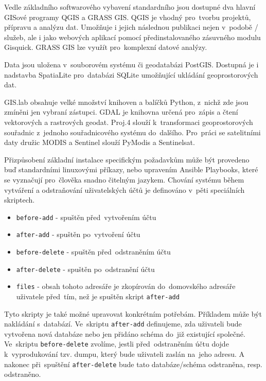Vedle základního softwarového vybavení standardního  jsou
dostupné dva hlavní GISové programy QGIS a GRASS GIS. \cite{gislab-main} QGIS je vhodný
pro~tvorbu projektů, přípravu a analýzu dat. Umožňuje i jejich
následnou publikaci nejen v~podobě / služeb, ale i
jako webových aplikací pomocí předinstalovaného zásuv\-ného modulu
Gisquick. GRASS GIS lze využít pro~komplexní datové analýzy.

Data jsou uložena v~souborovém systému či geodatabázi
PostGIS. Dostupná je i nadstavba SpatiaLite pro~databázi SQLite
umožňující ukládání geoprostorových dat. \cite{gislab-main}

GIS.lab obsahuje velké množství knihoven a balíčků Python, z~nichž zde
jsou zmíněni jen vybraní zástupci. GDAL je knihovna určená pro~zápis a
čtení vektorových a rastrových geodat. Proj.4 slouží k~transformaci
geoprostorových souřadnic z~jednoho souřadnicového systému do~dalšího. 
Pro~práci se satelitními daty družic MODIS a Sentinel slouží
PyModis a Sentinelsat.

Přizpůsobení základní instalace specifickým požadavkům může být
provedeno buď standardními linuxovými příkazy, nebo upravením Ansible
Playbooks, které se vyznačují pro~člověka snadno čitelným
jazykem. Chování systému během vytváření a odstraňování uživatelských
účtů je definováno v~pěti speciálních skriptech.
\begin{itemize}
\item \texttt{before-add} - spuštěn před~vytvořením účtu
\item \texttt{after-add} - spuštěn po~vytvoření účtu
\item \texttt{before-delete} - spuštěn před~odstraněním účtu
\item \texttt{after-delete} - spuštěn po~odstranění účtu
\item \texttt{files} - obsah tohoto adresáře je zkopírován do~domovského adresáře uživatele před~tím, než je spuštěn skript \texttt{after-add}
\end{itemize}
Tyto skripty je také možné upravovat konkrétním potřebám. Příkladem
může být nakládání s~databází. Ve~skriptu \texttt{after-add}
definujeme, zda uživateli bude vytvořena nová databáze nebo jen
přidáno schéma do~již existující společné. Ve~skrip\-tu
\texttt{before-delete} zvolíme, jestli před~odstraněním účtu dojde k~vyprodukování 
tzv. dumpu, který bude uživateli zaslán na~jeho
adresu. A nakonec při~spuštění \linebreak\texttt{after-delete} bude tato
databáze/schéma odstraněna, resp. odstraněno.

